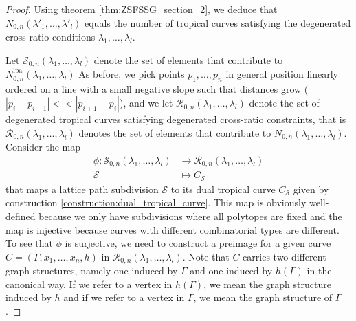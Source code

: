 \documentclass[11pt,reqno,a4]{amsart}
\theoremstyle{dotless}
\theoremstyle{definition}
\begin{document}
\begin{proof}
Using theorem \ref{thm:ZSFSSG_section_2}, we deduce that $N_{0,n}\left(\lambda'_1,\dots,\lambda'_l\right)$ equals the number of tropical curves satisfying the degenerated cross-ratio conditions $\lambda_1,\dots,\lambda_l$.


Let $\mathcal{S}_{0,n}\left( \lambda_1,\dots,\lambda_l\right)$ denote the set of elements that contribute to $N_{0,n}^{\textrm{lpa}}\left(\lambda_1,\dots,\lambda_l\right)$
As before, we pick points $p_1,\dots,p_n$ in general position linearly ordered on a line with a small negative slope such that distances grow ($|p_{i}-p_{i-1}| <<|p_{i+1}-p_i|$), and we let $\mathcal{R}_{0,n}\left(\lambda_1,\dots,\lambda_l\right)$ denote the set of degenerated tropical curves satisfying degenerated cross-ratio constraints, that is $\mathcal{R}_{0,n}\left(\lambda_1,\dots,\lambda_l\right)$ denotes the set of elements that contribute to $N_{0,n}\left(\lambda_1,\dots,\lambda_l\right)$. Consider the map
\begin{align*}
\phi:\mathcal{S}_{0,n}\left( \lambda_1,\dots,\lambda_l\right)
&\to
\mathcal{R}_{0,n}\left(\lambda_1,\dots,\lambda_l\right)\\
\mathcal{S}&\mapsto C_\mathcal{S}
\end{align*}
that maps a lattice path subdivision $\mathcal{S}$ to its dual tropical curve $C_\mathcal{S}$ given by construction \ref{construction:dual_tropical_curve}. This map is obviously well-defined because we only have subdivisions where all polytopes are fixed and the map is injective because curves with different combinatorial types are different. To see that $\phi$ is surjective, we need to construct a preimage for a given curve $C=(\Gamma,x_1,\dots,x_n,h)$ in $\mathcal{R}_{0,n}\left(\lambda_1,\dots,\lambda_l\right)$. Note that $C$ carries two different graph structures, namely one induced by $\Gamma$ and one induced by $h(\Gamma)$ in the canonical way. If we refer to a vertex in $h(\Gamma)$, we mean the graph structure induced by $h$ and if we refer to a vertex in $\Gamma$, we mean the graph structure of $\Gamma$.


\end{proof}
\end{document}

